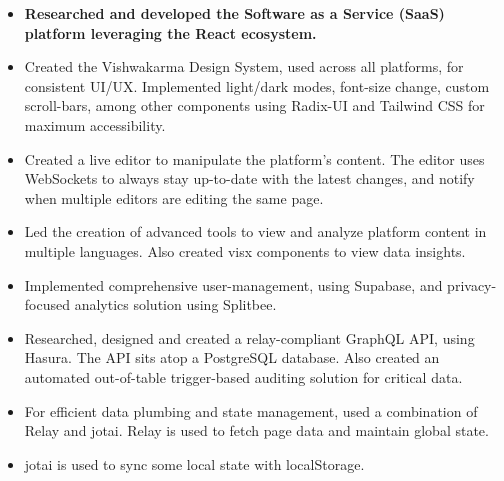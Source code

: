 \documentclass[10pt,a4paper,ragged2e,withhyper]{altacv}
\begin{document}
\tagline{}

\makecvheader



\begin{paracol}{2}


\begin{itemize}
\item \textbf{Researched and developed the Software as a Service (SaaS) platform leveraging the React ecosystem.}
\item Created the Vishwakarma Design System, used across all platforms, for consistent UI/UX.
      Implemented light/dark modes, font-size change, custom scroll-bars, among other components using Radix-UI and Tailwind CSS for maximum accessibility.
\item Created a live editor to manipulate the platform's content.
      The editor uses WebSockets to always stay up-to-date with the latest changes, and notify when multiple editors are editing the same page.
\item Led the creation of advanced tools to view and analyze platform content in multiple languages.
      Also created visx components to view data insights.
\item Implemented comprehensive user-management, using Supabase, and privacy-focused analytics solution using Splitbee.
\item Researched, designed and created a relay-compliant GraphQL API, using Hasura.
      The API sits atop a PostgreSQL database.
      Also created an automated out-of-table trigger-based auditing solution for critical data.
\item For efficient data plumbing and state management, used a combination of Relay and jotai.
      Relay is used to fetch page data and maintain global state.
\item jotai is used to sync some local state with localStorage.

\end{itemize}
\end{paracol}
\end{document}
